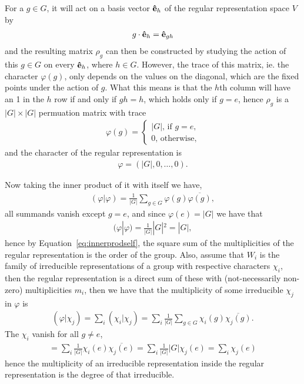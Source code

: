 For a $g \in G$, it will act on a basis vector $\mathbf{\hat{e}}_h$ of the regular representation space $V$ by
\begin{align*}
	g \cdot \mathbf{\hat{e}}_{h} = \mathbf{\hat{e}}_{gh}
\end{align*}
and the resulting matrix $\rho_g$ can then be constructed by studying the action of this $g \in G$ on every $\mathbf{\hat{e}}_h$, where $h \in G$. However, the trace of this matrix, ie. the character $\varphi(g)$, only depends on the values on the diagonal, which are the fixed points under the action of $g$. What this means is that the $h$th column will have an 1 in the $h$ row if and only if $gh = h$, which holds only if $g = e$, hence $\rho_g$ is a $|G| \times |G|$ permuation matrix with trace
\begin{align*}
	\varphi(g) = \begin{cases}
		|G| \text{, if $g = e$,} \\
		0 \text{, otherwise,}
	\end{cases}
\end{align*}
and the character of the regular representation is 
\begin{align*}
	\varphi = (|G|, 0, \dots, 0).
\end{align*}

Now taking the inner product of it with itself we have,
\begin{align*}
	(\varphi|\varphi) = \frac{1}{|G|} \sum_{g \in G} \varphi(g)\overline{\varphi(g)},
\end{align*}
all summands vanish except $g = e$, and since $\varphi(e) = |G|$ we have that
\begin{align*}
	(\varphi|\varphi) = \frac{1}{|G|} |G|^2 = |G|,
\end{align*}
hence by Equation~\ref{eq:innerprodself}, the square sum of the multiplicities of the regular representation is the order of the group. Also, assume that ${W_i}$ is the family of irreducible representations of a group with respective characters $\chi_i$, then the regular representation is a direct sum of these with (not-necessarily non-zero) multiplicities $m_i$, then we have that the multiplicity of some irreducible $\chi_j$ in $\varphi$ is
\begin{align*}
	(\varphi|\chi_j) = \sum_i (\chi_i|\chi_j) = \sum_i \frac{1}{|G|} \sum_{g \in G} \chi_i(g) \overline{\chi_j(g)}.
\end{align*}
The $\chi_i$ vanish for all $g \neq e$, 
\begin{align*}
	= \sum_i \frac{1}{|G|} \chi_i(e) \overline{\chi_j(e)} = \sum_i \frac{1}{|G|}|G|\chi_j(e) = \sum_i \chi_j(e)
\end{align*}
hence the multiplicity of an irreducible representation inside the regular representation is the degree of that irreducible.

